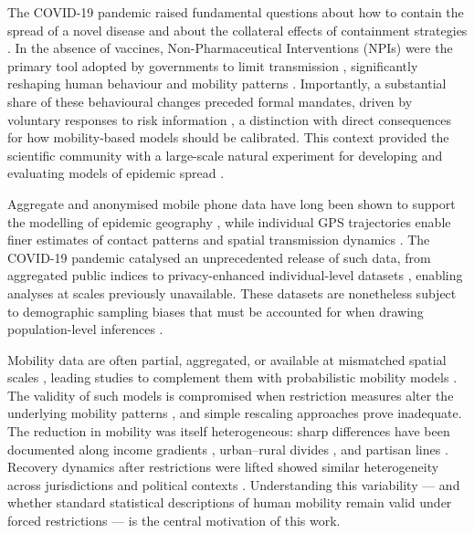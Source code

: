 \documentclass[main.tex]{subfiles}
\begin{document}
\label{introduction}

The COVID-19 pandemic raised fundamental questions about how to contain the spread
of a novel disease \cite{LepriCovid, EvaluationCovid} and about the collateral
effects of containment strategies \cite{CovidEffectEconomy}. In the absence of
vaccines, Non-Pharmaceutical Interventions (NPIs) were the primary tool adopted by
governments to limit transmission \cite{NPI1, NPIDD, NPI3}, significantly reshaping
human behaviour and mobility patterns \cite{SantanaChanges}. Importantly, a
substantial share of these behavioural changes preceded formal mandates, driven by
voluntary responses to risk information \cite{Goolsbee2020, Gupta2020, Xiong2020},
a distinction with direct consequences for how mobility-based models should be
calibrated. This context provided the scientific community with a large-scale natural
experiment for developing and evaluating models of epidemic spread
\cite{model0, model1, model2, model3, model4}.

Aggregate and anonymised mobile phone data have long been shown to support the
modelling of epidemic geography \cite{HumanProxiesModelling, MobilityMalaria}, while
individual GPS trajectories enable finer estimates of contact patterns and spatial
transmission dynamics \cite{Finger2016, LepriCovid, Alessandretti, Chang2021,
Kraemer2020}. The COVID-19 pandemic catalysed an unprecedented release of such data,
from aggregated public indices \cite{GoogleMobility, AppleMobility} to
privacy-enhanced individual-level datasets \cite{Chang2021, lucchini}, enabling
analyses at scales previously unavailable. These datasets are nonetheless subject to
demographic sampling biases that must be accounted for when drawing population-level
inferences \cite{Wesolowski2013, Zhao2016, Li2024}.

Mobility data are often partial, aggregated, or available at mismatched spatial
scales \cite{Gatto2020, Bertuzzo2020, Balcan2009a}, leading studies to complement
them with probabilistic mobility models \cite{Aleta2020, Arenas2020,
HumanProxiesModelling, CiofidegliAtti2008}. The validity of such models is
compromised when restriction measures alter the underlying mobility patterns
\cite{lucchini, Schlosser2020a}, and simple rescaling approaches prove inadequate.
The reduction in mobility was itself heterogeneous: sharp differences have been
documented along income gradients \cite{Weill2020}, urban--rural divides
\cite{Li2020}, and partisan lines \cite{Allcott2020, Grossman2020}. Recovery
dynamics after restrictions were lifted showed similar heterogeneity across
jurisdictions and political contexts \cite{Kim2021, Nguyen2020}. Understanding this
variability --- and whether standard statistical descriptions of human mobility
remain valid under forced restrictions --- is the central motivation of this work.
\end{document}
